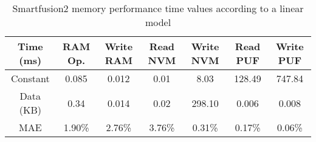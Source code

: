 \begin{table}[h!]
\centering
\def\arraystretch{1.5}
\begin{tabular}{|c|c|c|c|c|c|c|}
\hline
Time (ms) & RAM Op. & Write RAM & Read NVM & Write NVM & Read PUF & Write PUF \\ \hline
Constant  & 0.085     & 0.012     & 0.01     & 8.03      & 128.49    & 747.84  \\ \hline
Data (KB) & 0.34     & 0.014     & 0.02     & 298.10    & 0.006     & 0.008  \\ \hline
MAE       & 1.90\%    & 2.76\%    & 3.76\%   & 0.31\%    & 0.17\%    & 0.06\%  \\ \hline
\end{tabular}
\caption{Smartfusion2 memory performance time values according to a linear model}
\label{tab:memory-model}
\end{table}
